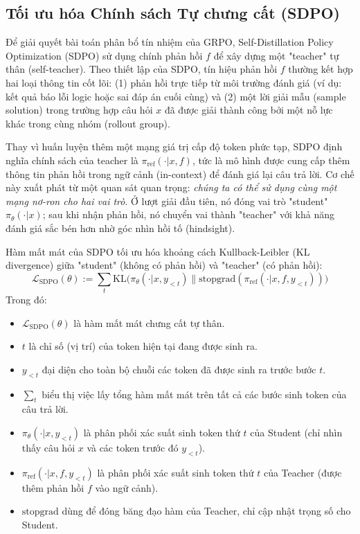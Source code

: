 \documentclass[12pt,a4paper]{report}
\begin{document}
\subsection{Tối ưu hóa Chính sách Tự chưng cất (SDPO)}
Để giải quyết bài toán phân bổ tín nhiệm của GRPO, Self-Distillation Policy Optimization (SDPO) \cite{hubotter2026sdpo} sử dụng chính phản hồi $f$ để xây dựng một "teacher" tự thân (self-teacher). Theo thiết lập của SDPO, tín hiệu phản hồi $f$ thường kết hợp hai loại thông tin cốt lõi: (1) phản hồi trực tiếp từ môi trường đánh giá (ví dụ: kết quả báo lỗi logic hoặc sai đáp án cuối cùng) và (2) một lời giải mẫu (sample solution) trong trường hợp câu hỏi $x$ đã được giải thành công bởi một nỗ lực khác trong cùng nhóm (rollout group). 

Thay vì huấn luyện thêm một mạng giá trị cấp độ token phức tạp, SDPO định nghĩa chính sách của teacher là $\pi_{\text{ref}}(\cdot | x, f)$, tức là mô hình được cung cấp thêm thông tin phản hồi trong ngữ cảnh (in-context) để đánh giá lại câu trả lời. Cơ chế này xuất phát từ một quan sát quan trọng: \textit{chúng ta có thể sử dụng cùng một mạng nơ-ron cho hai vai trò}. Ở lượt giải đầu tiên, nó đóng vai trò "student" $\pi_\theta(\cdot | x)$; sau khi nhận phản hồi, nó chuyển vai thành "teacher" với khả năng đánh giá sắc bén hơn nhờ góc nhìn hồi tố (hindsight).

Hàm mất mát của SDPO tối ưu hóa khoảng cách Kullback-Leibler (KL divergence) giữa "student" (không có phản hồi) và "teacher" (có phản hồi):
\begin{equation}
    \mathcal{L}_{\text{SDPO}}(\theta) := \sum_t \text{KL} \big( \pi_\theta(\cdot | x, y_{<t}) \| \text{stopgrad}(\pi_{\text{ref}}(\cdot | x, f, y_{<t})) \big)
\end{equation}
Trong đó:
\begin{itemize}
    \item $\mathcal{L}_{\text{SDPO}}(\theta)$ là hàm mất mát chưng cất tự thân.
    \item $t$ là chỉ số (vị trí) của token hiện tại đang được sinh ra.
    \item $y_{<t}$ đại diện cho toàn bộ chuỗi các token đã được sinh ra trước bước $t$.
    \item $\sum_t$ biểu thị việc lấy tổng hàm mất mát trên tất cả các bước sinh token của câu trả lời.
    \item $\pi_\theta(\cdot | x, y_{<t})$ là phân phối xác suất sinh token thứ $t$ của Student (chỉ nhìn thấy câu hỏi $x$ và các token trước đó $y_{<t}$).
    \item $\pi_{\text{ref}}(\cdot | x, f, y_{<t})$ là phân phối xác suất sinh token thứ $t$ của Teacher (được thêm phản hồi $f$ vào ngữ cảnh).
    \item $\text{stopgrad}$ dùng để đóng băng đạo hàm của Teacher, chỉ cập nhật trọng số cho Student.
\end{itemize}
\end{document}
